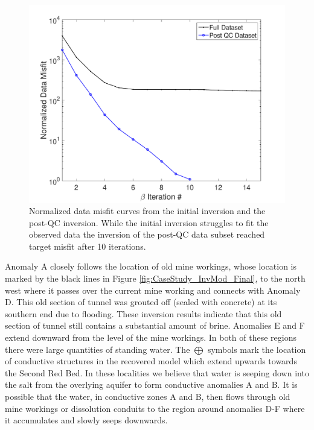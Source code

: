 \documentclass[final,authoryear,5p,times,twocolumn]{elsarticle}
\begin{document}
\begin{figure} [!ht]
\label{fig:CaseStudy_InvMod}
\end{figure}

\begin{figure} [!ht]
	\begin{center}
	\includegraphics[trim=1.3cm 0.2cm 2.6cm 1.2cm, clip=true,width=0.75\linewidth]{./Figures/Fig18.pdf}
	\end{center}
\caption{Normalized data misfit curves from the initial inversion and the post-QC inversion. While the initial inversion struggles to fit the observed data the inversion of the post-QC data subset reached target misfit after 10 iterations.}
\label{fig:CaseStudy_Inv_MisfitPlots}
\end{figure}

Anomaly A closely follows the location of old mine workings, whose location is marked by the black lines in Figure \ref{fig:CaseStudy_InvMod_Final}, to the north west where it passes over the current mine working and connects with Anomaly D. This old section of tunnel was grouted off (sealed with concrete) at its southern end due to flooding. These inversion results indicate that this old section of tunnel still contains a substantial amount of brine. Anomalies E and F extend downward from the level of the mine workings. In both of these regions there were large quantities of standing water. The $\bigoplus$ symbols mark the location of conductive structures in the recovered model which extend upwards towards the Second Red Bed. In these localities we believe that water is seeping down into the salt from the overlying aquifer to form conductive anomalies A and B. It is possible that the water, in conductive zones A and B, then flows through old mine workings or dissolution conduits to the region around anomalies D-F where it accumulates and slowly seeps downwards.
\end{document}
